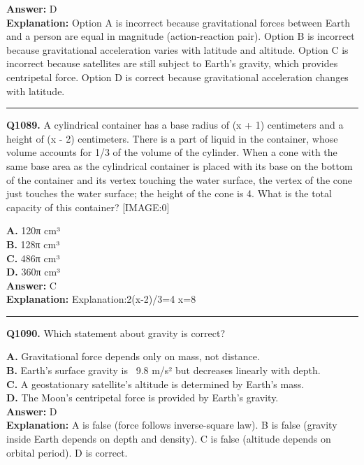 \documentclass[12pt]{article}
\begin{document}
\textbf{Answer:} D \\
\textbf{Explanation:} Option A is incorrect because gravitational forces between Earth and a person are equal in magnitude (action-reaction pair). Option B is incorrect because gravitational acceleration varies with latitude and altitude. Option C is incorrect because satellites are still subject to Earth's gravity, which provides centripetal force. Option D is correct because gravitational acceleration changes with latitude.

\hrule
\vspace{1em}


\noindent
\textbf{Q1089.} A cylindrical container has a base radius of (x + 1) centimeters and a height of (x - 2) centimeters. There is a part of liquid in the container, whose volume accounts for 1/3 of the volume of the cylinder. When a cone with the same base area as the cylindrical container is placed with its base on the bottom of the container and its vertex touching the water surface, the vertex of the cone just touches the water surface; the height of the cone is 4. What is the total capacity of this container?
[IMAGE:0]



\textbf{A.} 120π cm³ \\
\textbf{B.} 128π cm³ \\
\textbf{C.} 486π cm³ \\
\textbf{D.} 360π cm³ \\

\textbf{Answer:} C \\
\textbf{Explanation:} Explanation:2(x-2)/3=4 x=8

\hrule
\vspace{1em}


\noindent
\textbf{Q1090.} Which statement about gravity is correct?



\textbf{A.} Gravitational force depends only on mass, not distance. \\
\textbf{B.} Earth’s surface gravity is ~9.8 m/s² but decreases linearly with depth. \\
\textbf{C.} A geostationary satellite’s altitude is determined by Earth’s mass. \\
\textbf{D.} The Moon’s centripetal force is provided by Earth’s gravity. \\

\textbf{Answer:} D \\
\textbf{Explanation:} A is false (force follows inverse-square law). B is false (gravity inside Earth depends on depth and density). C is false (altitude depends on orbital period). D is correct.
\end{document}
